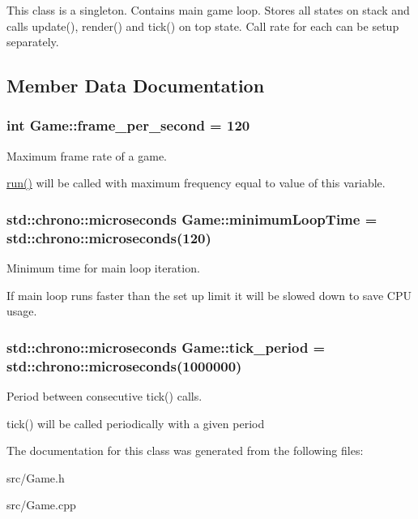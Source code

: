 This class is a singleton. Contains main game loop. Stores all states on stack and calls update(), render() and tick() on top state. Call rate for each can be setup separately. 

\subsection{Member Data Documentation}
\hypertarget{classGame_ac57ebbcb3e9f6add9b4bf066c900c0db}{
\subsubsection[{frame\-\_\-per\-\_\-second}]{\setlength{\rightskip}{0pt plus 5cm}int Game\-::frame\-\_\-per\-\_\-second = 120}}\label{classGame_ac57ebbcb3e9f6add9b4bf066c900c0db}


Maximum frame rate of a game. 

\hyperlink{classGame_a1ab78f5ed0d5ea879157357cf2fb2afa}{run()} will be called with maximum frequency equal to value of this variable. \hypertarget{classGame_af9f24863bbe8102d1bf5d97aaa449d14}{
\subsubsection[{minimum\-Loop\-Time}]{\setlength{\rightskip}{0pt plus 5cm}std\-::chrono\-::microseconds Game\-::minimum\-Loop\-Time = std\-::chrono\-::microseconds(120)}}\label{classGame_af9f24863bbe8102d1bf5d97aaa449d14}


Minimum time for main loop iteration. 

If main loop runs faster than the set up limit it will be slowed down to save C\-P\-U usage. \hypertarget{classGame_a65800b8c8afee406d719b404a4a78877}{
\subsubsection[{tick\-\_\-period}]{\setlength{\rightskip}{0pt plus 5cm}std\-::chrono\-::microseconds Game\-::tick\-\_\-period = std\-::chrono\-::microseconds(1000000)}}\label{classGame_a65800b8c8afee406d719b404a4a78877}


Period between consecutive tick() calls. 

tick() will be called periodically with a given period 

The documentation for this class was generated from the following files\-:\begin{DoxyCompactItemize}
\item 
src/Game.\-h\item 
src/Game.\-cpp\end{DoxyCompactItemize}
